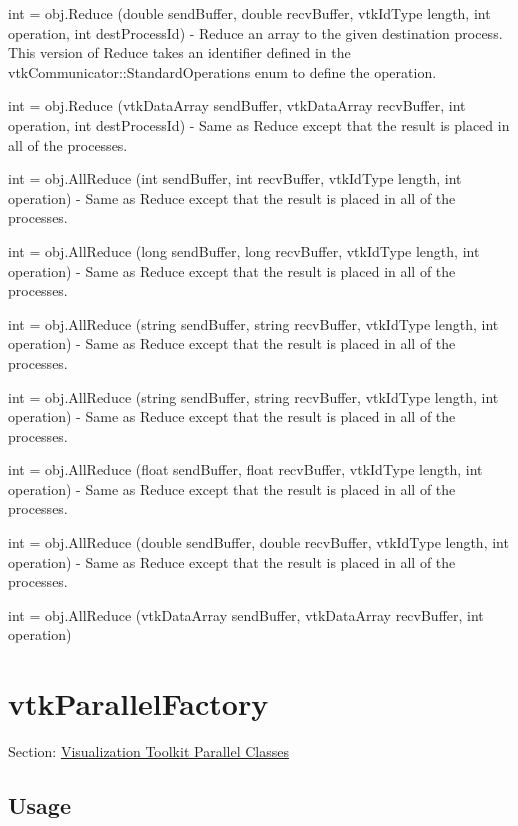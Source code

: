 \begin{DoxyItemize}
\item {\ttfamily int = obj.\-Reduce (double send\-Buffer, double recv\-Buffer, vtk\-Id\-Type length, int operation, int dest\-Process\-Id)} -\/ Reduce an array to the given destination process. This version of Reduce takes an identifier defined in the vtk\-Communicator\-::\-Standard\-Operations enum to define the operation.  
\item {\ttfamily int = obj.\-Reduce (vtk\-Data\-Array send\-Buffer, vtk\-Data\-Array recv\-Buffer, int operation, int dest\-Process\-Id)} -\/ Same as Reduce except that the result is placed in all of the processes.  
\item {\ttfamily int = obj.\-All\-Reduce (int send\-Buffer, int recv\-Buffer, vtk\-Id\-Type length, int operation)} -\/ Same as Reduce except that the result is placed in all of the processes.  
\item {\ttfamily int = obj.\-All\-Reduce (long send\-Buffer, long recv\-Buffer, vtk\-Id\-Type length, int operation)} -\/ Same as Reduce except that the result is placed in all of the processes.  
\item {\ttfamily int = obj.\-All\-Reduce (string send\-Buffer, string recv\-Buffer, vtk\-Id\-Type length, int operation)} -\/ Same as Reduce except that the result is placed in all of the processes.  
\item {\ttfamily int = obj.\-All\-Reduce (string send\-Buffer, string recv\-Buffer, vtk\-Id\-Type length, int operation)} -\/ Same as Reduce except that the result is placed in all of the processes.  
\item {\ttfamily int = obj.\-All\-Reduce (float send\-Buffer, float recv\-Buffer, vtk\-Id\-Type length, int operation)} -\/ Same as Reduce except that the result is placed in all of the processes.  
\item {\ttfamily int = obj.\-All\-Reduce (double send\-Buffer, double recv\-Buffer, vtk\-Id\-Type length, int operation)} -\/ Same as Reduce except that the result is placed in all of the processes.  
\item {\ttfamily int = obj.\-All\-Reduce (vtk\-Data\-Array send\-Buffer, vtk\-Data\-Array recv\-Buffer, int operation)}  
\end{DoxyItemize}\hypertarget{vtkparallel_vtkparallelfactory}{}\section{vtk\-Parallel\-Factory}\label{vtkparallel_vtkparallelfactory}
Section\-: \hyperlink{sec_vtkparallel}{Visualization Toolkit Parallel Classes} \hypertarget{vtkwidgets_vtkxyplotwidget_Usage}{}\subsection{Usage}\label{vtkwidgets_vtkxyplotwidget_Usage}
